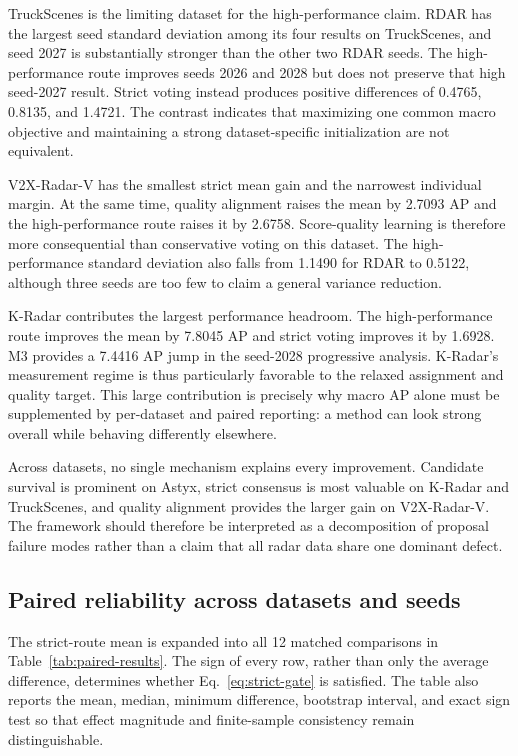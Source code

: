 \documentclass[final,5p,times]{elsarticle}
\newcommand{\tabref}[1]{\textcolor{floatreviewblue}{Table~\ref{#1}}}
\newcommand{\tabref}[1]{Table~\ref{#1}}
\begin{document}
TruckScenes is the limiting dataset for the high-performance claim. RDAR has
the largest seed standard deviation among its four results on TruckScenes, and
seed 2027 is substantially stronger than the other two RDAR seeds. The
high-performance route improves seeds 2026 and 2028 but does not preserve that
high seed-2027 result. Strict voting instead produces positive differences of
0.4765, 0.8135, and 1.4721. The contrast indicates that maximizing one common
macro objective and maintaining a strong dataset-specific initialization are
not equivalent.

V2X-Radar-V has the smallest strict mean gain and the narrowest individual
margin. At the same time, quality alignment raises the mean by 2.7093 AP and
the high-performance route raises it by 2.6758. Score-quality learning is
therefore more consequential than conservative voting on this dataset. The
high-performance standard deviation also falls from 1.1490 for RDAR to 0.5122,
although three seeds are too few to claim a general variance reduction.

K-Radar contributes the largest performance headroom. The high-performance
route improves the mean by 7.8045 AP and strict voting improves it by 1.6928.
M3 provides a 7.4416 AP jump in the seed-2028 progressive analysis. K-Radar's
measurement regime is thus particularly favorable to the relaxed assignment
and quality target. This large contribution is precisely why macro AP alone
must be supplemented by per-dataset and paired reporting: a method can look
strong overall while behaving differently elsewhere.

Across datasets, no single mechanism explains every improvement. Candidate
survival is prominent on Astyx, strict consensus is most valuable on K-Radar
and TruckScenes, and quality alignment provides the larger gain on
V2X-Radar-V. The framework should therefore be interpreted as a decomposition
of proposal failure modes rather than a claim that all radar data share one
dominant defect.

\subsection{Paired reliability across datasets and seeds}

The strict-route mean is expanded into all 12 matched comparisons in
\tabref{tab:paired-results}. The sign of every row, rather than only the
average difference, determines whether Eq.~\eqref{eq:strict-gate} is
satisfied. The table also reports the mean, median, minimum difference,
bootstrap interval, and exact sign test so that effect magnitude and
finite-sample consistency remain distinguishable.
\end{document}
